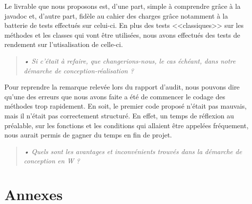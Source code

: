 \documentclass[12pt,a4paper]{report}
\begin{document}
Le livrable que nous proposons est, d'une part, simple à comprendre grâce à la javadoc et, d'autre part, fidèle au cahier des charges grâce notamment à la batterie de tests effectués sur celui-ci. En plus des tests <<classiques>> sur les méthodes et les classes qui vont être utilisées, nous avons effectués des tests de rendement sur l'utisalisation de celle-ci. 

\begin{quotation}
\textit{• Si c'était à refaire, que changerions-nous, le cas échéant, dans notre démarche de conception-réalisation ?}
\end{quotation}

Pour reprendre la remarque relevée lors du rapport d'audit, nous pouvons dire qu'une des erreurs que nous avons faite a été de commencer le codage des méthodes trop rapidement. En soit, le premier code proposé n'était pas mauvais, mais il n'était pas correctement structuré. En effet, un temps de réflexion au préalable, sur les fonctions et les conditions qui allaient être appelées fréquement, nous aurait permis de gagner du temps en fin de projet. 

\begin{quotation}
\textit{• Quels sont les avantages et inconvénients trouvés dans la démarche de conception en W ?}
\end{quotation}


\chapter*{Annexes}
\label{chapter:Annexes} %
\end{document}
